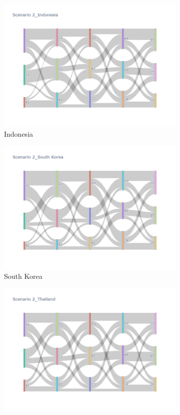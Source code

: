 \begin{figure}[h]
  \begin{subfigure}{0.5\textwidth}
    \centering
    \includegraphics[width=\textwidth]{Figure/figure32b.png}
    \caption{Indonesia}
  \end{subfigure}
  \begin{subfigure}{0.5\textwidth}
    \centering
    \includegraphics[width=\linewidth]{Figure/figure33b.png}
    \caption{South Korea}
  \end{subfigure}
  \begin{subfigure}{0.5\textwidth}
    \centering
    \includegraphics[width=\linewidth]{Figure/figure34b.png}

\end{subfigure}
\end{figure}
